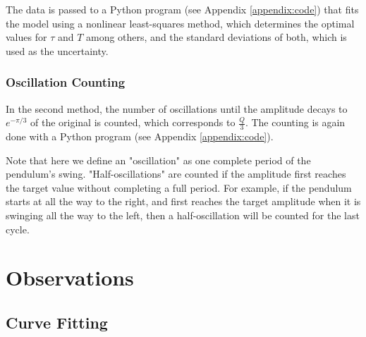 \documentclass[aps,twocolumn,secnumarabic,nobalancelastpage,amsmath,amssymb,nofootinbib]{revtex4}
\begin{document}
The data is passed to a Python program (see Appendix \ref{appendix:code}) that fits the model using a nonlinear
least-squares method, which determines the optimal values for \(\tau\) and \(T\) among others, and the standard
deviations of both, which is used as the uncertainty.

\subsubsection{Oscillation Counting}

In the second method, the number of oscillations until the amplitude decays to \(e^{-\pi/3}\) of the original is
counted, which corresponds to \(\frac{Q}{3}\). The counting is again done with a Python program (see Appendix
\ref{appendix:code}).

Note that here we define an "oscillation" as one complete period of the pendulum's swing. "Half-oscillations" are
counted if the amplitude first reaches the target value without completing a full period. For example, if the pendulum
starts at all the way to the right, and first reaches the target amplitude when it is swinging all the way to the left,
then a half-oscillation will be counted for the last cycle.


\section{Observations}

\subsection{Curve Fitting}
\end{document}
